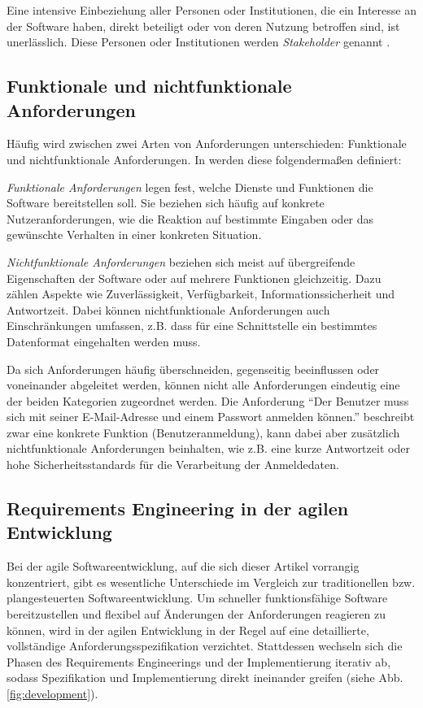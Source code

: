 \documentclass[acmtog]{acmart}
\begin{document}
Eine intensive Einbeziehung aller Personen oder Institutionen, die ein Interesse an der Software haben, direkt beteiligt oder von deren Nutzung betroffen sind, ist unerlässlich. Diese Personen oder Institutionen werden \emph{Stakeholder} genannt \cite{balzert09}.

\subsection{Funktionale und nichtfunktionale Anforderungen}
Häufig wird zwischen zwei Arten von Anforderungen unterschieden: Funktionale und nichtfunktionale Anforderungen. In \cite{sommerville16} werden diese folgendermaßen definiert:

\emph{Funktionale Anforderungen} legen fest, welche Dienste und Funktionen die Software bereitstellen soll. Sie beziehen sich häufig auf konkrete Nutzeranforderungen, wie die Reaktion auf bestimmte Eingaben oder das gewünschte Verhalten in einer konkreten Situation.

\emph{Nichtfunktionale Anforderungen} beziehen sich meist auf übergreifende Eigenschaften der Software oder auf mehrere Funktionen gleichzeitig. Dazu zählen Aspekte wie Zuverlässigkeit, Verfügbarkeit, Informationssicherheit und Antwortzeit. Dabei können nichtfunktionale Anforderungen auch Einschränkungen umfassen, z.B. dass für eine Schnittstelle ein bestimmtes Datenformat eingehalten werden muss.

Da sich Anforderungen häufig überschneiden, gegenseitig beeinflussen oder voneinander abgeleitet werden, können nicht alle Anforderungen eindeutig eine der beiden Kategorien zugeordnet werden. Die Anforderung ``Der Benutzer muss sich mit seiner E-Mail-Adresse und einem Passwort anmelden können.'' beschreibt zwar eine konkrete Funktion (Benutzeranmeldung), kann dabei aber zusätzlich nichtfunktionale Anforderungen beinhalten, wie z.B. eine kurze Antwortzeit oder hohe Sicherheitsstandards für die Verarbeitung der Anmeldedaten.

\subsection{Requirements Engineering in der agilen Entwicklung}
Bei der agile Softwareentwicklung, auf die sich dieser Artikel vorrangig konzentriert, gibt es wesentliche Unterschiede im Vergleich zur traditionellen bzw. plangesteuerten Softwareentwicklung.
Um schneller funktionsfähige Software bereitzustellen und flexibel auf Änderungen der Anforderungen reagieren zu können, wird in der agilen Entwicklung in der Regel auf eine detaillierte, vollständige  Anforderungsspezifikation verzichtet.
Stattdessen wechseln sich die Phasen des Requirements Engineerings und der Implementierung iterativ ab, sodass Spezifikation und Implementierung direkt ineinander greifen (siehe Abb. \ref{fig:development}).
\end{document}
